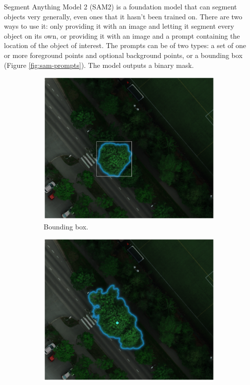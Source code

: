 \documentclass[english, 12pt, a4paper, sci, utf8, a-2b, online]{aaltothesis}
\begin{document}
Segment Anything Model 2 (SAM2) is a foundation model that can segment objects very generally, even ones that it hasn't been trained on. There are two ways to use it: only providing it with an image and letting it segment every object on its own, or providing it with an image and a prompt containing the location of the object of interest. The prompts can be of two types: a set of one or more foreground points and optional background points, or a bounding box (Figure \ref{fig:sam-prompts}). The model outputs a binary mask.

\begin{figure}[h]
    \centering
    \begin{subfigure}[t]{0.32\textwidth}
        \includegraphics[width=1.0\textwidth]{figures/sam-prompts/box.png}
        \caption{Bounding box.}
    \end{subfigure}
    \begin{subfigure}[t]{0.32\textwidth}
        \includegraphics[width=1.0\textwidth]{figures/sam-prompts/point.png}

\end{subfigure}
\end{figure}
\end{document}
